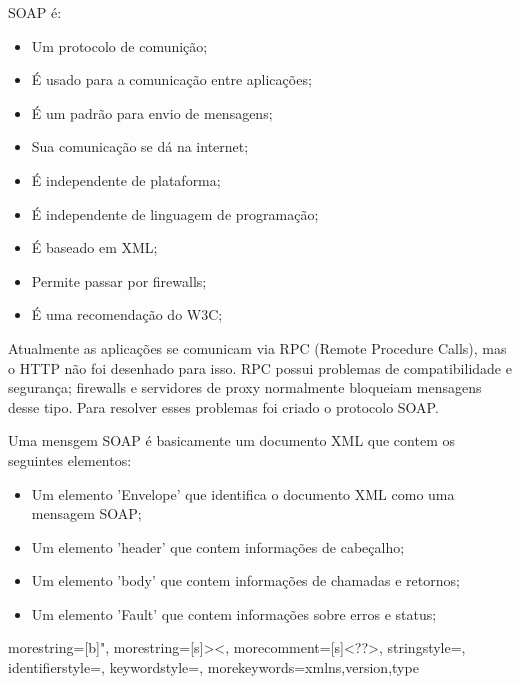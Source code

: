 SOAP é:

\begin{itemize}
	\item Um protocolo de comunição;
	\item É usado para a comunicação entre aplicações;
	\item É um padrão para envio de mensagens;
	\item Sua comunicação se dá na internet;
	\item É independente de plataforma;
	\item É independente de linguagem de programação;
	\item É baseado em XML;
	\item Permite passar por firewalls;
	\item É uma recomendação do W3C;
\end{itemize}

Atualmente as aplicações se comunicam via RPC (Remote Procedure Calls), mas o HTTP não foi desenhado para isso. RPC possui problemas de compatibilidade e segurança; firewalls e servidores de proxy normalmente bloqueiam mensagens desse tipo. Para resolver esses problemas foi criado o protocolo SOAP.

Uma mensgem SOAP é basicamente um documento XML que contem os seguintes elementos:

\begin{itemize}
	\item Um elemento 'Envelope' que identifica o documento XML como uma mensagem SOAP;
	\item Um elemento 'header' que contem informações de cabeçalho;
	\item Um elemento 'body' que contem informações de chamadas e retornos;
	\item Um elemento 'Fault' que contem informações sobre erros e status;
\end{itemize}




{
  morestring=[b]",
  morestring=[s]{>}{<},
  morecomment=[s]{<?}{?>},
  stringstyle=\color{black},
  identifierstyle=\color{darkblue},
  keywordstyle=\color{cyan},
  morekeywords={xmlns,version,type}%
}



